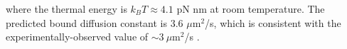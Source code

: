 %

where the thermal energy is $k_BT \approx 4.1$ pN nm at room temperature.  The predicted bound diffusion constant is 3.6 $\mu$m$^2$/s, which is consistent with the experimentally-observed value of $\sim 3\ \mu$m$^2$/s \cite{mahadevan18}.




